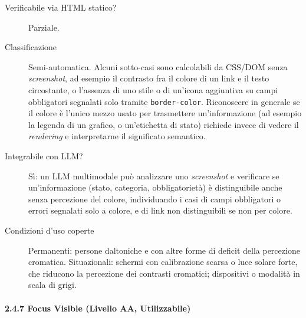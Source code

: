 \begin{description}

\item[Verificabile via HTML statico?] Parziale.

\item[Classificazione] Semi-automatica. Alcuni sotto-casi sono calcolabili da CSS/DOM senza \emph{screenshot}, ad esempio il contrasto fra il colore di un link e il testo circostante, o l'assenza di uno stile o di un'icona aggiuntiva su campi obbligatori segnalati solo tramite \texttt{border-color}. Riconoscere in generale se il colore è l'unico mezzo usato per trasmettere un'informazione (ad esempio la legenda di un grafico, o un'etichetta di stato) richiede invece di vedere il \emph{rendering} e interpretarne il significato semantico.

\item[Integrabile con LLM?] Sì: un LLM multimodale può analizzare uno \emph{screenshot} e verificare se un'informazione (stato, categoria, obbligatorietà) è distinguibile anche senza percezione del colore, individuando i casi di campi obbligatori o errori segnalati solo a colore, e di link non distinguibili se non per colore.

\item[Condizioni d'uso coperte] Permanenti: persone daltoniche e con altre forme di deficit della percezione cromatica. Situazionali: schermi con calibrazione scarsa o luce solare forte, che riducono la percezione dei contrasti cromatici; dispositivi o modalità in scala di grigi.

\end{description}

\paragraph*{2.4.7 Focus Visible (Livello AA, Utilizzabile)}


